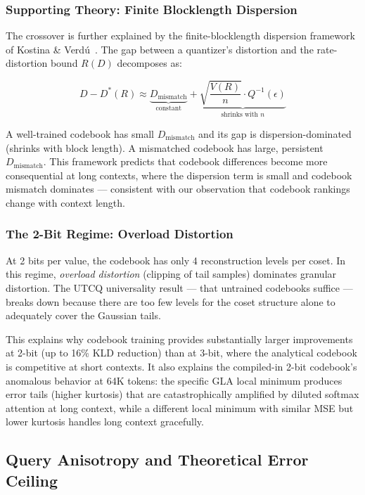 \documentclass{article}
\begin{document}
\subsubsection{Supporting Theory: Finite Blocklength Dispersion}

The crossover is further explained by the finite-blocklength dispersion
framework of Kostina \& Verd\'{u}~\cite{kostina2012finite}. The gap between a
quantizer's distortion and the rate-distortion bound $R(D)$ decomposes as:

\begin{equation}
D - D^*(R) \approx \underbrace{D_{\text{mismatch}}}_{\text{constant}} +
\underbrace{\sqrt{\frac{V(R)}{n}} \cdot Q^{-1}(\epsilon)}_{\text{shrinks with } n}
\end{equation}

A well-trained codebook has small $D_{\text{mismatch}}$ and its gap is
dispersion-dominated (shrinks with block length). A mismatched codebook has
large, persistent $D_{\text{mismatch}}$. This framework predicts that codebook
differences become more consequential at long contexts, where the dispersion
term is small and codebook mismatch dominates --- consistent with our
observation that codebook rankings change with context length.

\subsubsection{The 2-Bit Regime: Overload Distortion}

At 2 bits per value, the codebook has only 4 reconstruction levels per coset.
In this regime, \emph{overload distortion} (clipping of tail samples) dominates
granular distortion. The UTCQ universality result — that untrained codebooks
suffice — breaks down because there are too few levels for the coset structure
alone to adequately cover the Gaussian tails.

This explains why codebook training provides substantially larger improvements
at 2-bit (up to 16\% KLD reduction) than at 3-bit, where the analytical
codebook is competitive at short contexts. It also explains the compiled-in 2-bit codebook's anomalous behavior
at 64K tokens: the specific GLA local minimum produces error tails (higher
kurtosis) that are catastrophically amplified by diluted softmax attention at
long context, while a different local minimum with similar MSE but lower
kurtosis handles long context gracefully.

\subsection{Query Anisotropy and Theoretical Error Ceiling}
\label{sec:anisotropy}
\end{document}
